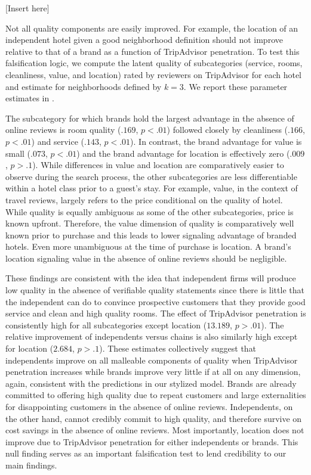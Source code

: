 \documentclass[mksc,blindrev]{informs3} %
\begin{document}
[Insert  here]

Not all quality components are easily improved. For example, the location of an independent hotel given a good neighborhood definition should not improve relative to that of a brand as a function of TripAdvisor penetration. To test this falsification logic, we compute the latent quality of subcategories (service, rooms, cleanliness, value, and location) rated by reviewers on TripAdvisor for each hotel and estimate  for neighborhoods defined by $k=3$. We report these parameter estimates in . 

The subcategory for which brands hold the largest advantage in the absence of online reviews is room quality ($.169$, $p<.01$) followed closely by cleanliness ($.166$, $p<.01$) and service ($.143$, $p<.01$). In contrast, the brand advantage for value is small ($.073$, $p<.01$) and the brand advantage for location is effectively zero ($.009$, $p>.1$). While differences in value and location are comparatively easier to observe during the search process, the other subcategories are less differentiable within a hotel class prior to a guest's stay. For example, value, in the context of travel reviews, largely refers to the price conditional on the quality of hotel. While quality is equally ambiguous as some of the other subcategories, price is known upfront. Therefore, the value dimension of quality is comparatively well known prior to purchase and this leads to lower signaling advantage of branded hotels. Even more unambiguous at the time of purchase is location. A brand's location signaling value in the absence of online reviews should be negligible.

These findings are consistent with the idea that independent firms will produce low quality in the absence of verifiable quality statements since there is little that the independent can do to convince prospective customers that they provide good service and clean and high quality rooms. The effect of TripAdvisor penetration is consistently high for all subcategories except location ($13.189$, $p>.01$). The relative improvement of independents versus chains is also similarly high except for location ($2.684$, $p>.1$). These estimates collectively suggest that independents improve on all malleable components of quality when TripAdvisor penetration increases while brands improve very little if at all on any dimension, again, consistent with the predictions in our stylized model. Brands are already committed to offering high quality due to repeat customers and large externalities for disappointing customers in the absence of online reviews. Independents, on the other hand, cannot credibly commit to high quality, and therefore survive on cost savings in the absence of online reviews. Most importantly, location does not improve due to TripAdvisor penetration for either independents or brands. This null finding serves as an important falsification test to lend credibility to our main findings.
\end{document}
